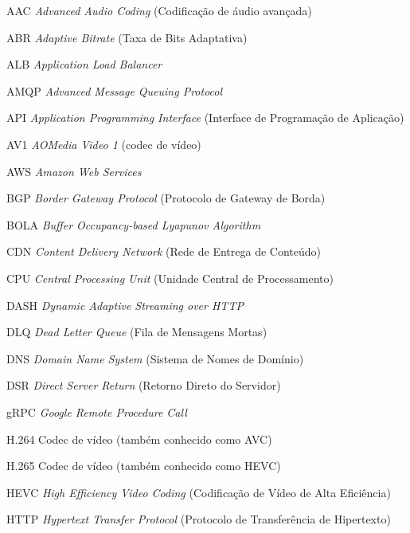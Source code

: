 
\listoffigures*
\cleardoublepage




\begin{siglas}
\item[AAC] \textit{Advanced Audio Coding} (Codificação de áudio avançada)
\item[ABR] \textit{Adaptive Bitrate} (Taxa de Bits Adaptativa)
\item[ALB] \textit{Application Load Balancer}
\item[AMQP] \textit{Advanced Message Queuing Protocol}
\item[API] \textit{Application Programming Interface} (Interface de Programação de Aplicação)
\item[AV1] \textit{AOMedia Video 1} (codec de vídeo)
\item[AWS] \textit{Amazon Web Services}
\item[BGP] \textit{Border Gateway Protocol} (Protocolo de Gateway de Borda)
\item[BOLA] \textit{Buffer Occupancy-based Lyapunov Algorithm}
\item[CDN] \textit{Content Delivery Network} (Rede de Entrega de Conteúdo)
\item[CPU] \textit{Central Processing Unit} (Unidade Central de Processamento)
\item[DASH] \textit{Dynamic Adaptive Streaming over HTTP}
\item[DLQ] \textit{Dead Letter Queue} (Fila de Mensagens Mortas)
\item[DNS] \textit{Domain Name System} (Sistema de Nomes de Domínio)
\item[DSR] \textit{Direct Server Return} (Retorno Direto do Servidor)
\item[gRPC] \textit{Google Remote Procedure Call}
\item[H.264] Codec de vídeo (também conhecido como AVC)
\item[H.265] Codec de vídeo (também conhecido como HEVC)
\item[HEVC] \textit{High Efficiency Video Coding} (Codificação de Vídeo de Alta Eficiência)
\item[HTTP] \textit{Hypertext Transfer Protocol} (Protocolo de Transferência de Hipertexto)

\end{siglas}
